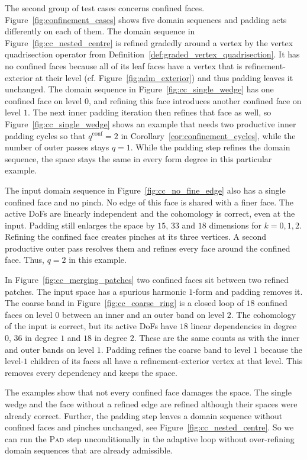 \documentclass[a4paper, 12pt]{article}
\theoremstyle{definition}
\theoremstyle{plain}
\numberwithin{equation}{section}
\begin{document}
\smallskip

The second group of test cases concerns confined faces. Figure~\ref{fig:confinement_cases} shows five domain sequences and padding acts differently on each of them. The domain sequence in Figure~\ref{fig:cc_nested_centre} is refined gradedly around a vertex by the vertex quadrisection operator from Definition~\ref{def:graded_vertex_quadrisection}. It has no confined faces because all of its leaf faces have a vertex that is refinement-exterior at their level (cf. Figure~\ref{fig:adm_exterior}) and thus padding leaves it unchanged. The domain sequence in Figure~\ref{fig:cc_single_wedge} has one confined face on level $0$, and refining this face introduces another confined face on level $1$. The next inner padding iteration then refines that face as well, so Figure~\ref{fig:cc_single_wedge} shows an example that needs two productive inner padding cycles so that $q^{\mathrm{conf}} = 2$ in Corollary~\ref{cor:confinement_cycles}, while the number of outer passes stays $q = 1$. While the padding step refines the domain sequence, the space stays the same in every form degree in this particular example.

The input domain sequence in Figure~\ref{fig:cc_no_fine_edge} also has a single confined face and no pinch. No edge of this face is shared with a finer face. The active DoFs are linearly independent and the cohomology is correct, even at the input. Padding still enlarges the space by $15$, $33$ and $18$ dimensions for $k = 0, 1, 2$. Refining the confined face creates pinches at its three vertices. A second productive outer pass resolves them and refines every face around the confined face. Thus, $q = 2$ in this example.

In Figure~\ref{fig:cc_merging_patches} two confined faces sit between two refined patches. The input space has a spurious harmonic $1$-form and padding removes it. The coarse band in Figure~\ref{fig:cc_coarse_ring} is a closed loop of $18$ confined faces on level $0$ between an inner and an outer band on level $2$. The cohomology of the input is correct, but its active DoFs have $18$ linear dependencies in degree $0$, $36$ in degree $1$ and $18$ in degree $2$. These are the same counts as with the inner and outer bands on level $1$. Padding refines the coarse band to level $1$ because the level-$1$ children of its faces all have a refinement-exterior vertex at that level. This removes every dependency and keeps the space.

The examples show that not every confined face damages the space. The single wedge and the face without a refined edge are refined although their spaces were already correct. Further, the padding step leaves a domain sequence without confined faces and pinches unchanged, see Figure~\ref{fig:cc_nested_centre}. So we can run the \textsc{Pad} step unconditionally in the adaptive loop without over-refining domain sequences that are already admissible.
\end{document}
